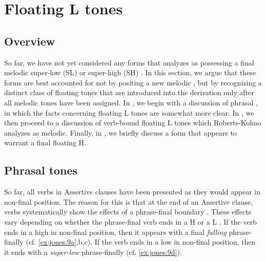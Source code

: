 \documentclass[output=paper,newtxmath,modfonts,nonflat,draft]{langsci/langscibook}
\begin{document}
\section{Floating L tones}\label{sec:jones:4}
\subsection{Overview}\label{sec:jones:4.1}

So far, we have not yet considered any forms that \citet{Roberts-Kohno2014} analyzes as possessing a final melodic super-low (SL) or super-high (SH) . In this section, we argue that these forms are best accounted for not by positing a new melodic , but by recognizing a distinct class of floating tones that are introduced into the derivation only after all melodic tones have been assigned. In , we begin with a discussion of phrasal , in which the facts concerning floating L tones are somewhat more clear. In , we then proceed to a discussion of verb-bound floating L tones which Roberts-Kohno analyzes as melodic. Finally, in , we briefly discuss a form that appears to warrant a final floating H.

\subsection{Phrasal tones}\label{sec:jones:4.2}

So far, all verbs in Assertive clauses have been presented as they would appear in non-final position. The reason for this is that at the end of an Assertive clause, verbs systematically show the effects of a phrase-final boundary . These effects vary depending on whether the phrase-final verb ends in a H  or a L . If the verb ends in a high  in non-final position, then it appears with a final \textit{falling}  phrase-finally (cf. \ref{ex:jones:9a},b,c). If the verb ends in a low  in non-final position, then it ends with a \textit{super-low}  phrase-finally (cf. \ref{ex:jones:9d}).
\end{document}
